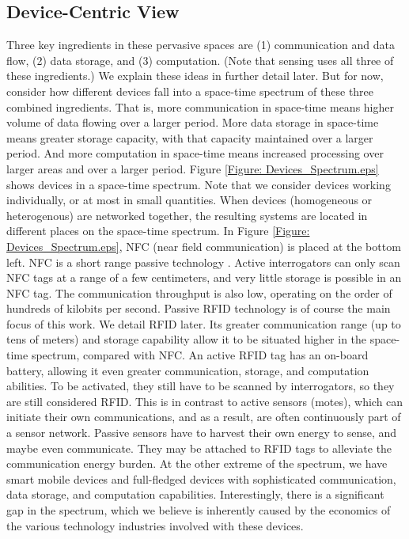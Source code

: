 \subsection{Device-Centric View}
Three key ingredients in these pervasive spaces are (1) communication and data flow, (2) data storage, and (3) computation. (Note that sensing uses all three of these ingredients.) We explain these ideas in further detail later. But for now, consider how different devices fall into a space-time spectrum of these three combined ingredients. That is, more communication in space-time means higher volume of data flowing over a larger period. More data storage in space-time means greater storage capacity, with that capacity maintained over a larger period. And more computation in space-time means increased processing over larger areas and over a larger period. Figure \ref{Figure: Devices_Spectrum.eps} shows devices in a space-time spectrum. Note that we consider devices working individually, or at most in small quantities. When devices (homogeneous or heterogenous) are networked together, the resulting systems are located in different places on the space-time spectrum. In Figure \ref{Figure: Devices_Spectrum.eps}, NFC (near field communication) is placed at the bottom left. NFC is a short range passive technology \cite{NFC}. Active interrogators can only scan NFC tags at a range of a few centimeters, and very little storage is possible in an NFC tag. The communication throughput is also low, operating on the order of hundreds of kilobits per second. Passive RFID technology is of course the main focus of this work. We detail RFID later. Its greater communication range (up to tens of meters) and storage capability allow it to be situated higher in the space-time spectrum, compared with NFC. An active RFID \cite{Active RFID} tag has an on-board battery, allowing it even greater communication, storage, and computation abilities. To be activated, they still have to be scanned by interrogators, so they are still considered RFID. This is in contrast to active sensors (motes), which can initiate their own communications, and as a result, are often continuously part of a sensor network. Passive sensors have to harvest their own energy to sense, and maybe even communicate. They may be attached to RFID tags to alleviate the communication energy burden. At the other extreme of the spectrum, we have smart mobile devices and full-fledged devices with sophisticated communication, data storage, and computation capabilities. Interestingly, there is a significant gap in the spectrum, which we believe is inherently caused by the economics of the various technology industries involved with these devices.

